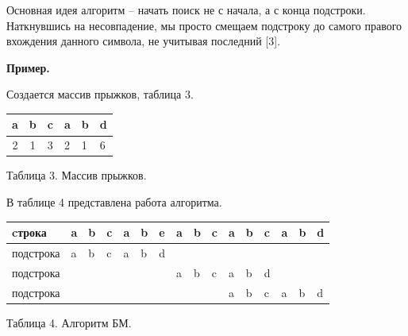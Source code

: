 \documentclass[a4paper,14pt]{article} %
\begin{document}
\begin{enumerate}
        Основная идея алгоритм -- начать поиск не с начала, а с конца подстроки. Наткнувшись на несовпадение, мы просто смещаем подстроку до самого правого вхождения данного символа, не учитывая последний [3].
        
        
          \textbf{Пример. }
        
        Создается массив прыжков, таблица 3. 
        
        \begin{center}
	\begin{tabular}{|c|c|c|l|l|l|}
	\hline
	a & b & c & a & b & d \\ \hline
	2 & 1 & 3 & 2 & 1 & 6 \\ \hline
	\end{tabular}
	
	Таблица 3.
	Массив прыжков.  
	\end{center}
	
        В таблице 4 представлена работа алгоритма. 	

        \begin{center}
	\begin{tabular}{|l|l|l|l|l|l|l|l|l|l|l|l|l|l|l|l|}
	\hline
	cтрока    & a & b & c & a & b & e                         & a & b & c & a                         & b                         & c                         & a                         	& b                         & d                         \\ \hline
	подстрока & a & b & c & a & b & \cellcolor[HTML]{FE0000}d &   &   &   &                           &                           &                           	&                           &                           &                           \\ \hline
	подстрока &   &   &   &   &   &                           & a & b & c & a                         & b                         & \cellcolor[HTML]{FE0000}d &                           &                           &                           \\ \hline
	подстрока &   &   &   &   &   &                           &   &   &   & \cellcolor[HTML]{34FF34}a & \cellcolor[HTML]{34FF34}b & 	\cellcolor[HTML]{34FF34}c & \cellcolor[HTML]{34FF34}a & \cellcolor[HTML]{34FF34}b & \cellcolor[HTML]{34FF34}d 	\\ \hline
	\end{tabular}
	
	Таблица 4.
	Алгоритм БМ.  
	\end{center}

        \end{enumerate}
        	                
\end{document}
